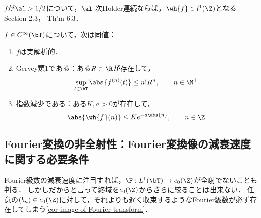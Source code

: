 \documentclass[uplatex,dvipdfmx]{jsreport}
\begin{document}
\begin{remarks}[Bernsteinの定理]
    $f$が$\al>1/2$について，$\al$-次Holder連続ならば，$\wh{f}\in l^1(\Z)$となる\cite{Stein-Shakarchi-03-Fourier} Section 2.3，\cite{Katznelson-Fourier} Th'm 6.3．

\end{remarks}

\begin{theorem}
    $f\in C^\infty(\bT)$について，次は同値：
    \begin{enumerate}
        \item $f$は実解析的．
        \item Gervey類1である：ある$R\in\R$が存在して，
        \[\sup_{t\in\bT}\abs{f^{(n)}(t)}\le n!R^n,\qquad n\in\N^+.\]
        \item 指数減少である：ある$K,a>0$が存在して，
        \[\abs{\wh{f}(n)}\le Ke^{-a\abs{n}},\qquad n\in\Z.\]
    \end{enumerate}
\end{theorem}

\subsection{Fourier変換の非全射性：Fourier変換像の減衰速度に関する必要条件}

\begin{tcolorbox}[colframe=ForestGreen, colback=ForestGreen!10!white,breakable,colbacktitle=ForestGreen!40!white,coltitle=black,fonttitle=\bfseries\sffamily,
title=対数速度で減少する数列はFourier係数列たり得ない]
    Fourier級数の減衰速度に注目すれば，$\F:L^1(\bT)\to c_0(\Z)$が全射でないことも判る．
    しかしだからと言って終域を$c_0(\Z)$からさらに絞ることは出来ない．
    任意の$(b_n)\in c_0(\Z)$に対して，それよりも遅く収束するようなFourier級数が必ず存在してしまう\ref{cor-image-of-Fourier-transform}．
\end{tcolorbox}
\end{document}
